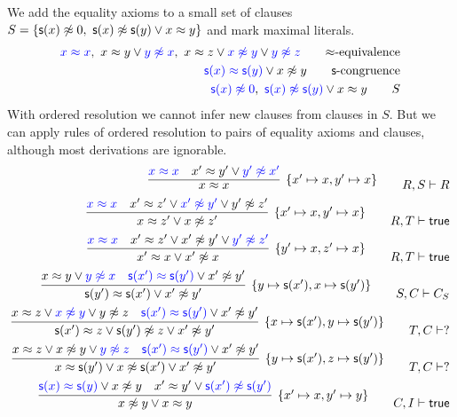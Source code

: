 \begin{example}
	We add the equality axioms to a small set of clauses
	\( S = \{ \msucc(x)\mNE 0,{\ }\msucc(x)\mNE\msucc(y)\lor x\mEQ y \} \) and mark maximal literals.
	\begin{align*}
	{\colN x \mEQ x},\
	x \mEQ y \lor {\colN y \mNE x},\
	x \mEQ z \lor {\colN x \mNE y} \lor {\colN y\mNE z}
\tag*{\( \mEQ \)-equivalence}
\\
	{\colN \msucc(x) \mEQ \msucc(y)} \lor x\mNE y
	\tag*{\( \msucc \)-congruence}
\\
	{\colN \msucc(x)\mNE 0},\
	{\colN \msucc(x) \mNE \msucc(y)} \lor x \mEQ y
\tag*{\( S \)}
	\end{align*}
	With ordered resolution we cannot infer new clauses from clauses in \( S \).
	But we can apply rules of ordered resolution to pairs of equality axioms and clauses,
	although most derivations are ignorable.
	\begin{align*}
\infer[ \{ x'\mapsto x, y'\mapsto x\}]
{x \mEQ x}
{{\colN x \mEQ x} & x' \mEQ y' \lor {\colN y' \mNE x'}}
\tag*{\( R,S\proves R \)}
\\
\infer[ \{ x'\mapsto x,y'\mapsto x \}]
{x\mEQ z'\lor x\mNE z' }
{{\colN x \mEQ x} & x' \mEQ z' \lor {\colN x' \mNE y'} \lor {y'\mNE z'}}
\tag*{\( R,T\proves\true \)}
\\
\infer[ \{ y'\mapsto x, z'\mapsto x \}]
{x'\mEQ x\lor x'\mNE x }
{{\colN x \mEQ x} & x' \mEQ z' \lor {x' \mNE y'} \lor {\colN y'\mNE z'}}
\tag*{\( R,T\proves\true \)}
\\
\infer[ \{ y\mapsto \msucc(x'), x\mapsto\msucc(y')\}]
{\msucc(y')\mEQ\msucc(x')\lor x'\mNE y'}
{x \mEQ y \lor {\colN y \mNE x} & {\colN \msucc(x') \mEQ \msucc(y')} \lor x'\mNE y'}
\tag*{\( S,C\proves C_S \)}
\\
\infer[ \{ x\mapsto\msucc(x'),y\mapsto\msucc(y')\}]
{\msucc(x')\mEQ z\lor \msucc(y')\mNE z \lor x'\mNE y'}
{x \mEQ z \lor {\colN x \mNE y} \lor {y\mNE z} & {\colN \msucc(x') \mEQ \msucc(y')} \lor x'\mNE y'}
\tag*{\( T,C\proves ? \)}
\\
\infer[ \{ y\mapsto\msucc(x'),z\mapsto\msucc(y')\}]
{x\mEQ\msucc(y')\lor x\mNE\msucc(x')\lor x'\mNE y'}
{x \mEQ z \lor {x \mNE y} \lor {\colN y\mNE z} & {\colN \msucc(x') \mEQ \msucc(y')} \lor x'\mNE y'}
\tag*{\( T,C\proves ? \)}
\\
\infer[ \{ x'\mapsto x, y'\mapsto y\}]
{x\mNE y\lor x\mEQ y}
{{\colN \msucc(x) \mEQ \msucc(y)} \lor x\mNE y & x' \mEQ y' \lor {\colN \msucc(x') \mNE \msucc(y')}}
\tag*{\( C,I\proves\true \)}
\\
	\end{align*}
\end{example}

